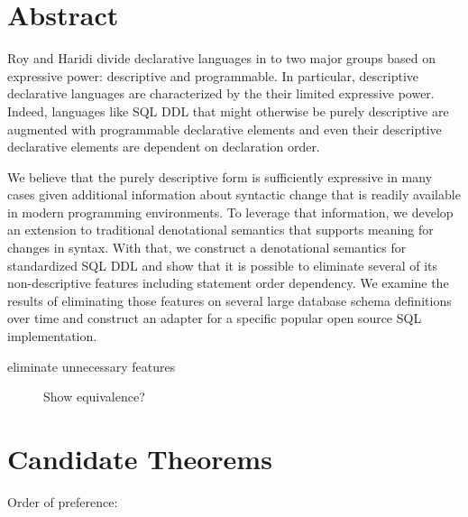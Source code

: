 \documentclass[12pt]{article}
\begin{document}
\section{Abstract}

Roy and Haridi \cite{RoyH2004} divide declarative languages in to two major groups based on expressive power: descriptive and programmable. In particular, descriptive declarative languages are characterized by the their limited expressive power. Indeed, languages like SQL DDL that might otherwise be purely descriptive are augmented with programmable declarative elements and even their descriptive declarative elements are dependent on declaration order.

We believe that the purely descriptive form is sufficiently expressive in many cases given additional information about syntactic change that is readily available in modern programming environments. To leverage that information, we develop an extension to traditional denotational semantics that supports meaning for changes in syntax. With that, we construct a denotational semantics for standardized SQL DDL and show that it is possible to eliminate several of its non-descriptive features including statement order dependency. We examine the results of eliminating those features on several large database schema definitions over time and construct an adapter for a specific popular open source SQL implementation.

\begin{description}
  \item[eliminate unnecessary features] Show equivalence?
\end{description}

\section{Candidate Theorems}
\label{sec:theorems}

Order of preference:
\end{document}
